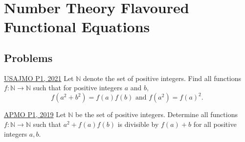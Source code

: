 \section{Number Theory Flavoured Functional Equations}
\subsection{Problems}
\begin{problem}{1}{\href{https://artofproblemsolving.com/community/q2h2529938p34791441}{USAJMO P1, 2021}}
	Let $\mathbb{N}$ denote the set of positive integers. Find all functions $f : \mathbb{N} \rightarrow \mathbb{N}$ such that for positive integers $a$ and $b,$\[f(a^2 + b^2) = f(a)f(b) \text{ and } f(a^2) = f(a)^2.\]
\end{problem}

\begin{problem}{2}{\href{https://artofproblemsolving.com/community/c6h1854148p12519631}{APMO P1, 2019}}
	Let $\mathbb{N}$ be the set of positive integers. Determine all functions $f:\mathbb{N}\to\mathbb{N}$ such that $a^2+f(a)f(b)$ is divisible by $f(a)+b$ for all positive integers $a,b$.
\end{problem}

\newpage
